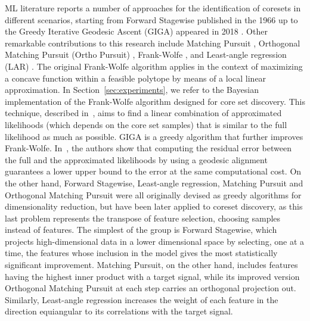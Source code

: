 \documentclass{article}
\begin{document}
ML literature reports a number of approaches for the identification of coresets in different scenarios, starting from Forward Stagewise published in the 1966 \cite{Efroymson1960} up to the Greedy Iterative Geodesic Ascent (GIGA) appeared in 2018 \cite{campbell2018bayesian}. Other remarkable contributions to this research include Matching Pursuit \cite{mallat1993}, Orthogonal Matching Pursuit (Ortho Pursuit) \cite{Pati1993}, Frank-Wolfe \cite{clarkson2010coresets}, and Least-angle regression (LAR) \cite{Efron2004, Boutsidis2013}. The original Frank-Wolfe algorithm applies in the context of maximizing a concave function within a feasible polytope by means of a local linear approximation. In Section~\ref{sec:experiments}, we refer to the Bayesian implementation of the Frank-Wolfe algorithm designed for core set discovery. This technique, described in~\cite{campbell2017automated}, aims to find a linear combination of approximated likelihoods (which depends on the core set samples) that is similar to the full likelihood as much as possible. GIGA is a greedy algorithm that further improves Frank-Wolfe. In~\cite{campbell2018bayesian}, the authors show that computing the residual error between the full and the approximated likelihoods by using a geodesic alignment guarantees a lower upper bound to the error at the same computational cost. On the other hand, Forward Stagewise, Least-angle regression, Matching Pursuit and Orthogonal Matching Pursuit were all originally devised as greedy algorithms for dimensionality reduction, but have been later applied to coreset discovery, as this last problem represents the transpose of feature selection, choosing samples instead of features. The simplest of the group is Forward Stagewise, which projects high-dimensional data in a lower dimensional space by selecting, one at a time, the features whose inclusion in the model gives the most statistically significant improvement. Matching Pursuit, on the other hand, includes features having the highest inner product with a target signal, while its improved version Orthogonal Matching Pursuit at each step carries an orthogonal projection out. Similarly, Least-angle regression increases the weight of each feature in the direction equiangular to its correlations with the target signal.
\end{document}
